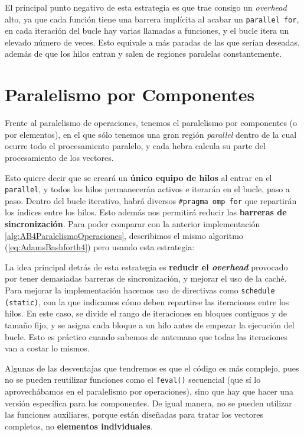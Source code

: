 El principal punto negativo de esta estrategia es que trae consigo un \textit{overhead} alto, ya que cada función tiene una barrera implícita al acabar un \texttt{parallel for}, en cada iteración del bucle hay varias llamadas a funciones, y el bucle itera un elevado número de veces. Esto equivale a más paradas de las que serían deseadas, además de que los hilos entran y salen de regiones paralelas constantemente.

\section{Paralelismo por Componentes}

Frente al paralelismo de operaciones, tenemos el paralelismo por componentes (o por elementos), en el que sólo tenemos una gran región \textit{parallel} dentro de la cual ocurre todo el procesamiento paralelo, y cada hebra calcula su parte del procesamiento de los vectores.

Esto quiere decir que se creará un \textbf{único equipo de hilos} al entrar en el \texttt{parallel}, y todos los hilos permanecerán activos e iterarán en el bucle, paso a paso. Dentro del bucle iterativo, habrá diversos \texttt{\#pragma omp for} que repartirán los índices entre los hilos. Esto además nos permitirá reducir las \textbf{barreras de sincronización}. Para poder comparar con la anterior implementación \ref{alg:AB4ParalelismoOperaciones}, describimos el mismo algoritmo (\ref{eq:AdamsBashforth4}) pero usando esta estrategia:

La idea principal detrás de esta estrategia es \textbf{reducir el \textit{overhead}} provocado por tener demasiadas barreras de sincronización, y mejorar el uso de la caché. Para mejorar la implementación hacemos uso de directivas como \texttt{schedule (static)}, con la que indicamos cómo deben repartirse las iteraciones entre los hilos. En este caso, se divide el rango de iteraciones en bloques contiguos y de tamaño fijo, y se asigna cada bloque a un hilo antes de empezar la ejecución del bucle. Esto es práctico cuando sabemos de antemano que todas las iteraciones van a costar lo mismos.

Algunas de las desventajas que tendremos es que el código es más complejo, pues no se pueden reutilizar funciones como el \texttt{feval()} secuencial (que sí lo aprovechábamos en el paralelismo por operaciones), sino que hay que hacer una versión específica para los componentes. De igual manera, no se pueden utilizar las funciones auxiliares, porque están diseñadas para tratar los vectores completos, no \textbf{elementos individuales}.

